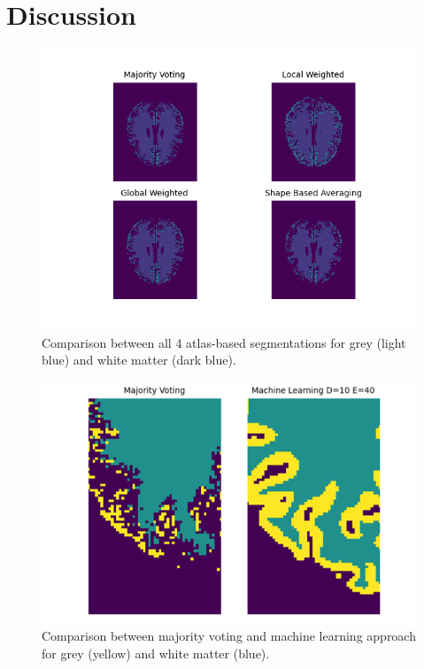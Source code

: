 \section*{Discussion}

\begin{figure}[h!]
	\centering
	\includegraphics[width=0.8\linewidth]{img/compareSegmentationSlice}
	\caption{Comparison between all 4 atlas-based segmentations for grey (light blue) and white matter (dark blue).}
	\label{fig:compareSegmentationSlice}
\end{figure}

\begin{figure}[h!]
	\centering
	\includegraphics[width=0.8\linewidth]{img/compareGreyMatter}
	\caption{Comparison between majority voting and machine learning approach for grey (yellow) and white matter (blue).}
	\label{fig:compareGreyMatter}
\end{figure}